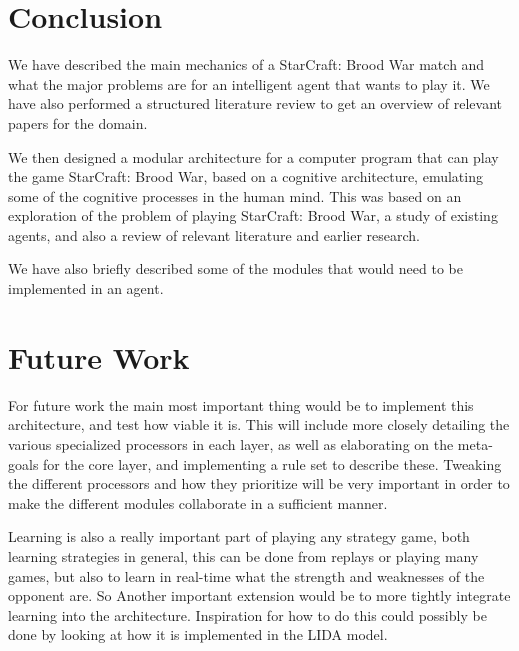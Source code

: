 \section{Conclusion}
\label{sec:conclusion}
We have described the main mechanics of a StarCraft: Brood War match and what
the major problems are for an intelligent agent that wants to play it. We have
also performed a structured literature review to get an overview of relevant
papers for the domain.

We then designed a modular architecture for a computer program that can play the
game StarCraft: Brood War, based on a cognitive architecture, emulating some of
the cognitive processes in the human mind. This was based on an exploration of
the problem of playing StarCraft: Brood War, a study of existing agents, and
also a review of relevant literature and earlier research.

We have also briefly described some of the modules that would need to be
implemented in an agent.

\section{Future Work}
\label{sec:futurework}
For future work the main most important thing would be to implement this
architecture, and test how viable it is. This will include more closely
detailing the various specialized processors in each layer, as well as
elaborating on the meta-goals for the core layer, and implementing a rule set to
describe these. Tweaking the different processors and how they prioritize will
be very important in order to make the different modules collaborate in a
sufficient manner.  

Learning is also a really important part of playing any strategy game, both
learning strategies in general, this can be done from replays or playing many
games, but also to learn in real-time what the strength and weaknesses of the
opponent are. So Another important extension would be to more tightly integrate
learning into the architecture. Inspiration for how to do this could possibly be
done by looking at how it is implemented in the LIDA
model\cite{franklin2007lida}.
